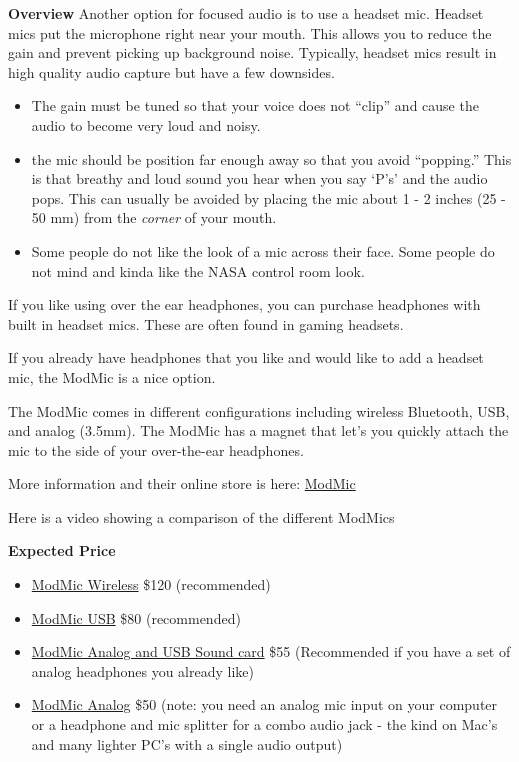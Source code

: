 \begin{gram}
\textbf{Overview}
Another option for focused audio is to use a headset mic. Headset mics put the microphone right near your mouth.
This allows you to reduce the gain and prevent picking up background noise.
Typically, headset mics result in high quality audio capture but have a few downsides.
\begin{itemize}
\item The gain must be tuned so that your voice does not ``clip'' and cause the audio to become very loud and noisy. 
\item the mic should be position far enough away so that you avoid ``popping.'' This is that breathy and loud sound you hear when you say `P's' and the audio pops. This can usually be avoided by placing the mic about 1 - 2 inches (25 - 50 mm) from the \textit{corner} of your mouth.
\item Some people do not like the look of a mic across their face. Some people do not mind and kinda like the NASA control room look.
\end{itemize}

If you like using over the ear headphones, you can purchase headphones with built in headset mics. These are often found in gaming headsets.

If you already have headphones that you like and would like to add a headset mic, the ModMic is a nice option. 

The ModMic comes in different configurations including wireless Bluetooth, USB, and analog (3.5mm). The ModMic has a magnet that let's you quickly attach the mic to the side of your over-the-ear headphones.

More information and their online store is here: \href{https://antlionaudio.com/collections/microphones}{ModMic}

Here is a video showing a 
{comparison of the different ModMics}

\textbf{Expected Price}
\begin{itemize}
	\item \href{https://antlionaudio.com/collections/microphones/products/modmic-wireless}{ModMic Wireless} \$120 (recommended)
	\item \href{https://antlionaudio.com/collections/microphones/products/modmic-usb}{ModMic USB} \$80 (recommended)
	\item \href{https://antlionaudio.com/products/modmic-uni-usb-sound-card}{ModMic Analog and USB Sound card} \$55 (Recommended if you have a set of analog headphones you already like) 
	\item \href{https://antlionaudio.com/collections/microphones/products/modmic-uni}{ModMic Analog} \$50 (note: you need an analog mic input on your computer or a headphone and mic splitter for a combo audio jack - the kind on Mac's and many lighter PC's with a single audio output) 
\end{itemize}


\end{gram}
